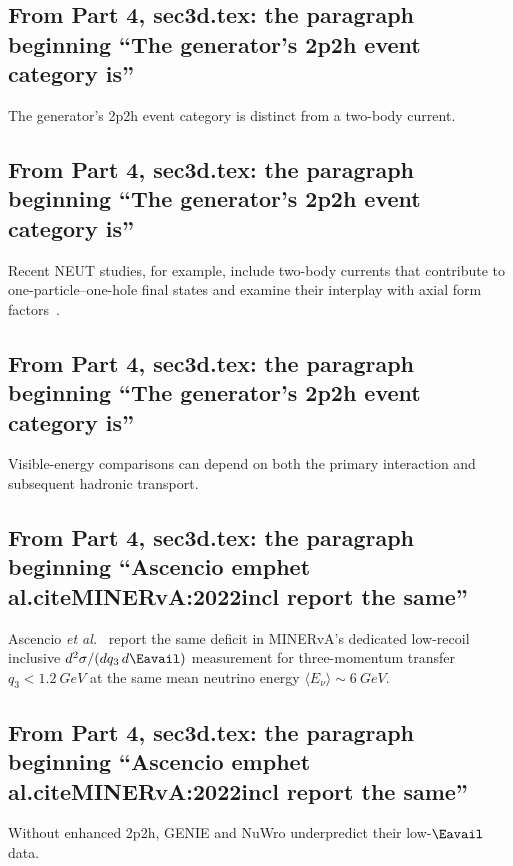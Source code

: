 \subsection{From Part 4, sec3d.tex: the paragraph beginning ``The generator's 2p2h event category is''}
The generator's 2p2h event category is distinct from a two-body current.

\subsection{From Part 4, sec3d.tex: the paragraph beginning ``The generator's 2p2h event category is''}
Recent NEUT studies, for example, include two-body currents that contribute to one-particle--one-hole final states and examine their interplay with axial form factors~\cite{FrancoMunoz:2026currents}.

\subsection{From Part 4, sec3d.tex: the paragraph beginning ``The generator's 2p2h event category is''}
Visible-energy comparisons can depend on both the primary interaction and subsequent hadronic transport.

\subsection{From Part 4, sec3d.tex: the paragraph beginning ``Ascencio emphet al.citeMINERvA:2022incl report the same''}
Ascencio \emph{et al.}~\cite{MINERvA:2022incl} report the same deficit in MINERvA's dedicated low-recoil inclusive $d^{2}\sigma/(dq_{3}\,d\Eavail)$ measurement for three-momentum transfer $q_{3}<\SI{1.2}{GeV}$ at the same mean neutrino energy $\langle E_\nu\rangle\sim\SI{6}{GeV}$.

\subsection{From Part 4, sec3d.tex: the paragraph beginning ``Ascencio emphet al.citeMINERvA:2022incl report the same''}
Without enhanced 2p2h, GENIE and NuWro underpredict their low-$\Eavail$ data.

